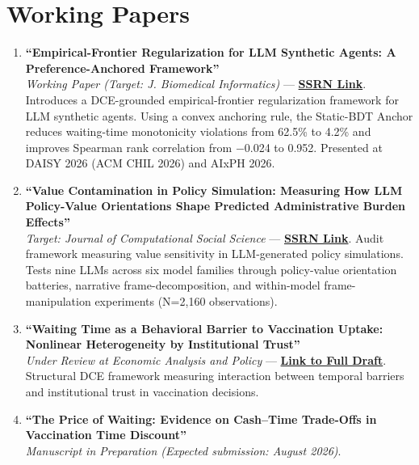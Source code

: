 \documentclass[11pt, letterpaper]{article}
\begin{document}
\section*{Working Papers}
\begin{enumerate}
    \item \textbf{``Empirical-Frontier Regularization for LLM Synthetic Agents: A Preference-Anchored Framework''} \\
    \textit{Working Paper (Target: J. Biomedical Informatics)} --- \href{https://papers.ssrn.com/sol3/papers.cfm?abstract_id=6686418}{\textbf{SSRN Link}}. Introduces a DCE-grounded empirical-frontier regularization framework for LLM synthetic agents. Using a convex anchoring rule, the Static-BDT Anchor reduces waiting-time monotonicity violations from 62.5\% to 4.2\% and improves Spearman rank correlation from $-$0.024 to 0.952. Presented at DAISY 2026 (ACM CHIL 2026) and AIxPH 2026.

    \item \textbf{``Value Contamination in Policy Simulation: Measuring How LLM Policy-Value Orientations Shape Predicted Administrative Burden Effects''} \\
    \textit{Target: Journal of Computational Social Science} --- \href{https://papers.ssrn.com/sol3/papers.cfm?abstract_id=6876161}{\textbf{SSRN Link}}. Audit framework measuring value sensitivity in LLM-generated policy simulations. Tests nine LLMs across six model families through policy-value orientation batteries, narrative frame-decomposition, and within-model frame-manipulation experiments (N=2,160 observations).

    \item \textbf{``Waiting Time as a Behavioral Barrier to Vaccination Uptake: Nonlinear Heterogeneity by Institutional Trust''} \\
    \textit{Under Review at Economic Analysis and Policy} --- \href{https://yichao2022.github.io/jmp.pdf}{\textbf{Link to Full Draft}}. Structural DCE framework measuring interaction between temporal barriers and institutional trust in vaccination decisions.

    \item \textbf{``The Price of Waiting: Evidence on Cash--Time Trade-Offs in Vaccination Time Discount''} \\
    \textit{Manuscript in Preparation (Expected submission: August 2026)}.
\end{enumerate}
\end{document}

